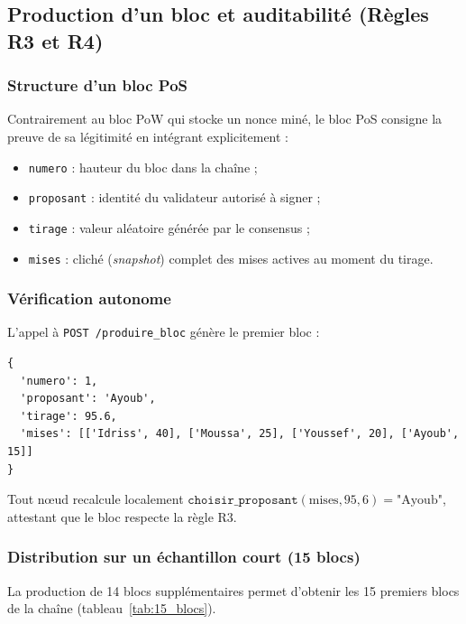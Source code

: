 \documentclass[11pt,a4paper]{article}
\begin{document}
\subsection{Production d'un bloc et auditabilité (Règles R3 et R4)}

\subsubsection*{Structure d'un bloc PoS}
Contrairement au bloc PoW qui stocke un nonce miné, le bloc PoS consigne la preuve de sa légitimité en intégrant explicitement :
\begin{itemize}
    \item \texttt{numero} : hauteur du bloc dans la chaîne ;
    \item \texttt{proposant} : identité du validateur autorisé à signer ;
    \item \texttt{tirage} : valeur aléatoire générée par le consensus ;
    \item \texttt{mises} : cliché (\emph{snapshot}) complet des mises actives au moment du tirage.
\end{itemize}

\subsubsection*{Vérification autonome}
L'appel à \texttt{POST /produire\_bloc} génère le premier bloc :
\begin{lstlisting}
{
  'numero': 1,
  'proposant': 'Ayoub',
  'tirage': 95.6,
  'mises': [['Idriss', 40], ['Moussa', 25], ['Youssef', 20], ['Ayoub', 15]]
}
\end{lstlisting}
Tout nœud recalcule localement $\texttt{choisir\_proposant}(\text{mises}, 95{,}6) = \text{"Ayoub"}$, attestant que le bloc respecte la règle R3.

\subsubsection*{Distribution sur un échantillon court (15 blocs)}
La production de 14 blocs supplémentaires permet d'obtenir les 15 premiers blocs de la chaîne (tableau~\ref{tab:15_blocs}).
\end{document}
